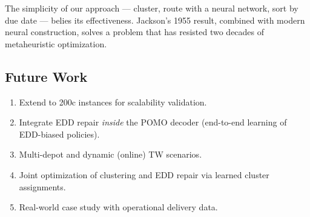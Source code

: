 \documentclass[11pt,a4paper]{article}
\begin{document}
The simplicity of our approach — cluster, route with a neural network, sort by
due date — belies its effectiveness. Jackson's 1955 result, combined with modern
neural construction, solves a problem that has resisted two decades of
metaheuristic optimization.

\subsection{Future Work}
\begin{enumerate}[nosep]
    \item Extend to 200c instances for scalability validation.
    \item Integrate EDD repair \textit{inside} the POMO decoder (end-to-end
    learning of EDD-biased policies).
    \item Multi-depot and dynamic (online) TW scenarios.
    \item Joint optimization of clustering and EDD repair via learned cluster
    assignments.
    \item Real-world case study with operational delivery data.
\end{enumerate}

\end{document}
